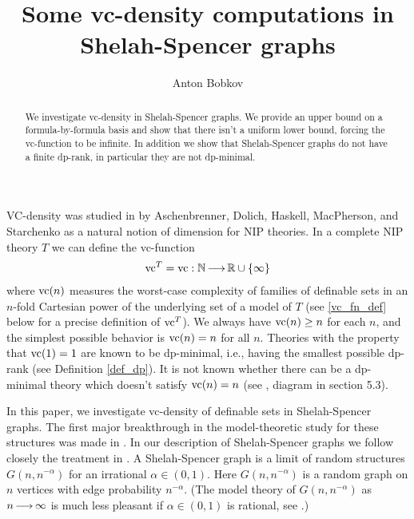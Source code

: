 \documentclass{amsart}
\title{Some vc-density computations in Shelah-Spencer graphs}
\author{Anton Bobkov}
\begin{document}
\begin{abstract}
  We investigate vc-density in Shelah-Spencer graphs.
  We provide an upper bound on a formula-by-formula basis and show that there isn't a uniform lower bound,
  forcing the vc-function to be infinite.
  In addition we show that Shelah-Spencer graphs do not have a finite dp-rank,
  in particular they are not dp-minimal.
\end{abstract}

\maketitle


VC-density was studied in \cite{density} by Aschenbrenner, Dolich, Haskell, MacPherson, and Starchenko as a natural notion of dimension for NIP theories.
In a complete NIP theory $T$ we can define the vc-function
\begin{align*}
  \operatorname{vc}^T = \operatorname{vc} : \mathbb{N} \operatorname{\longrightarrow} \mathbb{R} \cup \left\{\infty\right\}
\end{align*}
where $\operatorname{vc}(n)$ measures the worst-case complexity of families of definable sets in an $n$-fold Cartesian power of the underlying set of a model of $T$
(see \ref{vc_fn_def} below for a precise definition of $\operatorname{vc}^T$).
We always have $\operatorname{vc}(n) \geq n$ for each $n$, and the simplest possible behavior is $\operatorname{vc}(n) = n$ for all $n$. Theories with the property that $\operatorname{vc}(1) = 1$ are known to be dp-minimal, i.e., having the smallest possible dp-rank (see Definition \ref{def_dp}). It is not known whether there can be a dp-minimal theory which doesn't satisfy $\operatorname{vc}(n)=n$
(see \cite{density}, diagram in section 5.3).

In this paper, we investigate vc-density of definable sets in Shelah-Spencer graphs.
The first major breakthrough in the  model-theoretic study for these structures was made in \cite{spencer}.
In our description of Shelah-Spencer graphs we follow closely the treatment in \cite{laskowski}.
A Shelah-Spencer graph is a limit of random structures $G(n, n^{-\alpha})$ for an irrational $\alpha \in (0,1)$.
Here $G(n, n^{-\alpha})$ is a random graph on $n$ vertices with edge probability $n^{-\alpha}$.
(The model theory of $G(n, n^{-\alpha})$ as $n \operatorname{\longrightarrow} \infty$ is much less pleasant if $\alpha \in (0,1)$ is rational, see \cite{rational}.)
\end{document}
